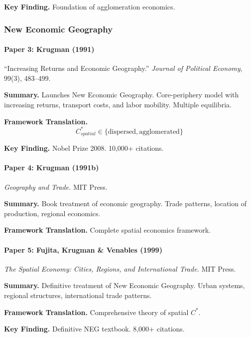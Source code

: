 \textbf{Key Finding.}
Foundation of agglomeration economics.

\subsubsection{New Economic Geography}

\paragraph{Paper 3: Krugman (1991)}

``Increasing Returns and Economic Geography.''
\textit{Journal of Political Economy}, 99(3), 483--499.

\textbf{Summary.}
Launches New Economic Geography. Core-periphery model with increasing 
returns, transport costs, and labor mobility. Multiple equilibria.

\textbf{Framework Translation.}
\begin{equation}
C^*_{spatial} \in \{\text{dispersed}, \text{agglomerated}\}
\end{equation}

\textbf{Key Finding.}
Nobel Prize 2008. 10,000+ citations.

\paragraph{Paper 4: Krugman (1991b)}

\textit{Geography and Trade.}
MIT Press.

\textbf{Summary.}
Book treatment of economic geography. Trade patterns, location of 
production, regional economics.

\textbf{Framework Translation.}
Complete spatial economics framework.

\paragraph{Paper 5: Fujita, Krugman \& Venables (1999)}

\textit{The Spatial Economy: Cities, Regions, and International Trade.}
MIT Press.

\textbf{Summary.}
Definitive treatment of New Economic Geography. Urban systems, regional 
structures, international trade patterns.

\textbf{Framework Translation.}
Comprehensive theory of spatial $C^*$.

\textbf{Key Finding.}
Definitive NEG textbook. 8,000+ citations.

